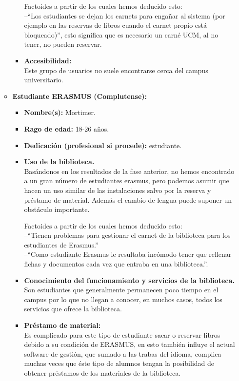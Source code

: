 \documentclass[12pt]{article}
\begin{document}
\begin{itemize}
\begin{itemize}
\begin{itemize}
			Factoides a partir de los cuales hemos deducido esto: \\
			--``Los estudiantes se dejan los carnets para engañar al sistema (por ejemplo en las reservas de libros cuando el carnet propio está bloqueado)'', esto significa que es necesario un carné UCM, al no tener, no pueden reservar.

		\item \textbf{Accesibilidad: \\}
			Este grupo de usuarios no suele encontrarse cerca del campus universitario.

	\end{itemize}
	\item \textbf{Estudiante ERASMUS (Complutense): }
	
	\begin{itemize}
	
		\item \textbf{Nombre(s):}  Mortimer. \\
	\item \textbf{Rago de edad:} 18-26 años. \\
	\item \textbf{Dedicación (profesional si procede):} estudiante. \\
		\item \textbf{Uso de la biblioteca. \\}
			Basándonos en los resultados de la fase anterior, no hemos encontrado a un gran número de estudiantes erasmus, pero podemos asumir que hacen un uso similar de las instalaciones salvo por la reserva y préstamo de material. Además el cambio de lengua puede suponer un obstáculo importante.

			Factoides a partir de los cuales hemos deducido esto: \\--``Tienen problemas para gestionar el carnet de la biblioteca para los estudiantes de Erasmus.'' \\ --``Como estudiante Erasmus le resultaba incómodo tener que rellenar fichas y documentos cada vez que entraba en una biblioteca.''.

		\item \textbf{Conocimiento del funcionamiento y servicios de la biblioteca. \\}
			Son estudiantes que generalmente permanecen poco tiempo en el campus por lo que no llegan a conocer, en muchos casos, todos los servicios que ofrece la biblioteca.

		\item \textbf{Préstamo de material: \\}
			Es complicado para este tipo de estudiante sacar o reservar libros debido a su condición de ERASMUS, en esto también influye el actual software de gestión, que sumado a las trabas del idioma, complica muchas veces que éste tipo de alumnos tengan la posibilidad de obtener préstamos de los materiales de la biblioteca.


\end{itemize}
\end{itemize}
\end{itemize}
\end{document}
